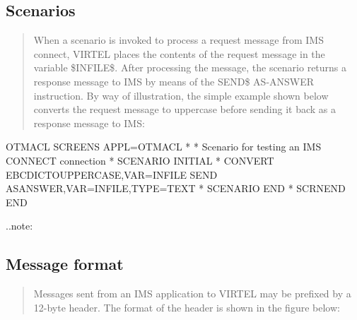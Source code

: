 \documentclass[letterpaper,10pt,english]{sphinxmanual}
\begin{document}
\subsection{Scenarios}
\label{\detokenize{connectivity_guide:scenarios}}\label{\detokenize{connectivity_guide:index-26}}\begin{quote}

When a scenario is invoked to process a request message from IMS connect, VIRTEL places the contents of the request message in the variable \$INFILE\$. After processing the message, the scenario  returns a response message to IMS by means of the SEND\$ AS-ANSWER instruction. By way of illustration, the simple example shown below converts the request message to uppercase before sending it back as a response message to IMS:
\end{quote}

\begin{sphinxVerbatim}[commandchars=\\\{\}]
OTMACL SCREENS APPL=OTMACL
*
* Scenario for testing an IMS CONNECT connection
*
SCENARIO INITIAL
*
CONVERT\PYGZdl{} EBCDIC\PYGZhy{}TO\PYGZhy{}UPPERCASE,VAR=\PYGZsq{}\PYGZdl{}INFILE\PYGZdl{}\PYGZsq{}
SEND\PYGZdl{} AS\PYGZhy{}ANSWER,VAR=\PYGZsq{}\PYGZdl{}INFILE\PYGZdl{}\PYGZsq{},TYPE=\PYGZsq{}TEXT\PYGZsq{}
*
SCENARIO END
*
SCRNEND
END
\end{sphinxVerbatim}


..note:

\begin{sphinxVerbatim}[commandchars=\\\{\}]
           
\end{sphinxVerbatim}


\subsection{Message format}
\label{\detokenize{connectivity_guide:message-format}}\label{\detokenize{connectivity_guide:index-27}}\begin{quote}

Messages sent from an IMS application to VIRTEL may be prefixed by a 12-byte header. The format of the header is shown in the figure below:
\end{quote}
\end{document}
